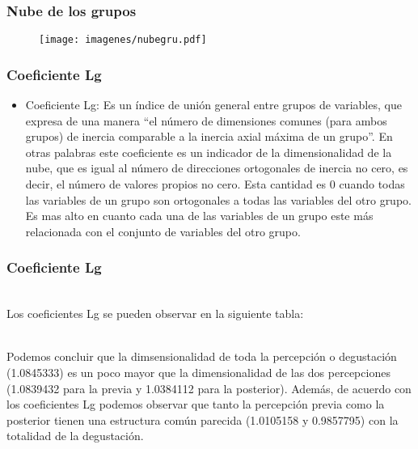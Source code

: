 \documentclass[12pt]{beamer}
\begin{document}
\begin{frame}
\frametitle{Nube de los grupos}
\begin{figure}[h]
  \centering
  \texttt{[image: imagenes/nubegru.pdf]}
\end{figure}
\end{frame}

\begin{frame}
\frametitle{Coeficiente Lg}
\begin{itemize}
\item Coeficiente Lg: Es un índice de unión general entre grupos de variables, que expresa de una manera ``el número de dimensiones comunes (para ambos grupos) de inercia comparable a la inercia axial máxima de un grupo''. En otras palabras este coeficiente es un indicador de la dimensionalidad de la nube, que es igual al número de direcciones ortogonales de inercia no cero, es decir, el número de valores propios no cero. Esta cantidad es 0 cuando todas las variables de un grupo son ortogonales a todas las variables del otro grupo. Es mas alto en cuanto cada una de las variables de un grupo este más relacionada con el conjunto de variables del otro grupo.
\end{itemize}
\end{frame}

\begin{frame}
\frametitle{Coeficiente Lg}
~\\Los coeficientes Lg se pueden observar en la siguiente tabla:
\begin{center}
\end{center}
~\\Podemos concluir que la dimsensionalidad de toda la percepción o degustación (1.0845333) es un poco mayor que la dimensionalidad de las dos percepciones (1.0839432 para la previa y 1.0384112 para la posterior). Además, de acuerdo con los coeficientes Lg podemos observar que tanto la percepción previa como la posterior tienen una estructura común parecida (1.0105158 y 0.9857795) con la totalidad de la degustación.
\end{frame}
\end{document}
